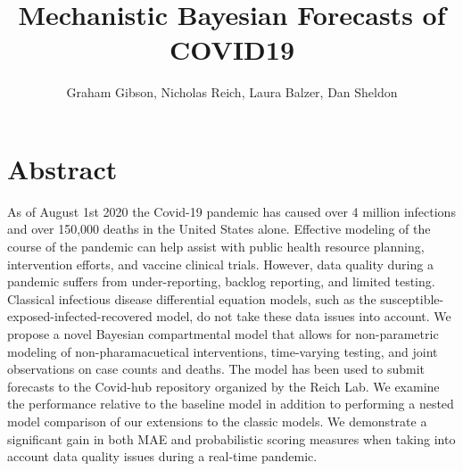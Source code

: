 \documentclass[11pt]{amsart}
\title{Mechanistic Bayesian Forecasts of COVID19}
\author{Graham Gibson, Nicholas Reich, Laura Balzer, Dan Sheldon}
\begin{document}
\section*{Abstract}

As of August 1st 2020 the Covid-19 pandemic has caused over 4 million infections and over 150,000 deaths in the United States alone. Effective modeling of the course of the pandemic can help assist with public health resource planning, intervention efforts, and vaccine clinical trials. However, data quality during a pandemic suffers from under-reporting, backlog reporting, and limited testing. Classical infectious disease differential equation models, such as the susceptible-exposed-infected-recovered model, do not take these data issues into account. We propose a novel Bayesian compartmental model that allows for non-parametric modeling of non-pharamacuetical interventions, time-varying testing, and joint observations on case counts and deaths. The model has been used to submit forecasts to the Covid-hub repository organized by the Reich Lab. We examine the performance relative to the baseline model in addition to performing a nested model comparison of our extensions to the classic models. We demonstrate a significant gain in both MAE and probabilistic scoring measures when taking into account data quality issues during a real-time pandemic.
\end{document}
